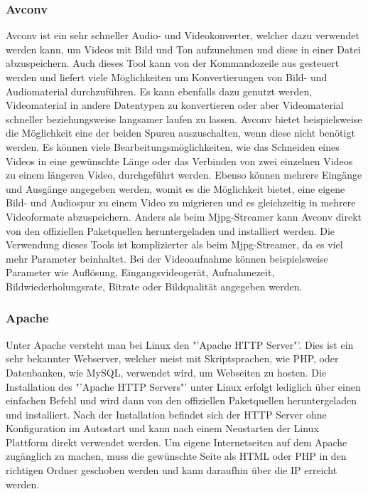 \subsubsection{Avconv}
Avconv ist ein sehr schneller Audio- und Videokonverter, welcher dazu verwendet werden kann, um Videos mit Bild und Ton aufzunehmen und diese in einer Datei abzuspeichern. Auch dieses Tool kann von der Kommandozeile aus gesteuert werden und liefert viele Möglichkeiten um Konvertierungen von Bild- und Audiomaterial durchzuführen. Es kann ebenfalls dazu genutzt werden, Videomaterial in andere Datentypen zu konvertieren oder aber Videomaterial schneller beziehungsweise langsamer laufen zu lassen. Avconv bietet beispielsweise die Möglichkeit eine der beiden Spuren auszuschalten, wenn diese nicht benötigt werden. Es können viele Bearbeitungsmöglichkeiten, wie das Schneiden eines Videos in eine gewünschte Länge oder das Verbinden von zwei einzelnen Videos zu einem längeren Video, durchgeführt werden. Ebenso können mehrere Eingänge und Ausgänge angegeben werden, womit es die Möglichkeit bietet, eine eigene Bild- und Audiospur zu einem Video zu migrieren und es gleichzeitig in mehrere Videoformate abzuspeichern. Anders als beim Mjpg-Streamer kann Avconv direkt von den offiziellen Paketquellen heruntergeladen und installiert werden. Die Verwendung dieses Tools ist komplizierter als beim Mjpg-Streamer, da es viel mehr Parameter beinhaltet. Bei der Videoaufnahme können beispielsweise Parameter wie Auflösung, Eingangsvideogerät, Aufnahmezeit, Bildwiederholungsrate, Bitrate oder Bildqualität angegeben werden. \cite{Avconv}

\subsubsection{Apache}
Unter Apache versteht man bei Linux den "'Apache HTTP Server"'. Dies ist ein sehr bekannter Webserver, welcher meist mit Skriptsprachen, wie PHP, oder Datenbanken, wie MySQL, verwendet wird, um Webseiten zu hosten. Die Installation des "'Apache HTTP Servers"' unter Linux erfolgt lediglich über einen einfachen Befehl und wird dann von den offiziellen Paketquellen heruntergeladen und installiert. Nach der Installation befindet sich der HTTP Server ohne Konfiguration im Autostart und kann nach einem Neustarten der Linux Plattform direkt verwendet werden. Um eigene Internetseiten auf dem Apache zugänglich zu machen, muss die gewünschte Seite als HTML oder PHP in den richtigen Ordner geschoben werden und kann daraufhin über die IP erreicht werden. \cite{Apache}

